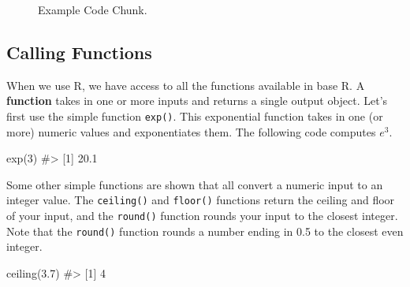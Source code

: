 \documentclass[
  letterpaper,
]{latex/krantz}
\makeatletter
\newenvironment{Shaded}{\begin{snugshade}}{\end{snugshade}}
\newcommand{\CommentTok}[1]{\textcolor[rgb]{0.37,0.37,0.37}{#1}}
\newcommand{\DecValTok}[1]{\textcolor[rgb]{0.68,0.00,0.00}{#1}}
\newcommand{\FloatTok}[1]{\textcolor[rgb]{0.68,0.00,0.00}{#1}}
\newcommand{\FunctionTok}[1]{\textcolor[rgb]{0.28,0.35,0.67}{#1}}
\newcommand{\NormalTok}[1]{\textcolor[rgb]{0.00,0.23,0.31}{#1}}
\newenvironment{kframe}{%
\medskip{}
\setlength{\fboxsep}{.8em}
 \def\at@end@of@kframe{}%
 \ifinner\ifhmode%
  \def\at@end@of@kframe{\end{minipage}}%
  \begin{minipage}{\columnwidth}%
 \fi\fi%
 \def\FrameCommand##1{\hskip\@totalleftmargin \hskip-\fboxsep
 \colorbox{shadecolor}{##1}\hskip-\fboxsep
     \hskip-\linewidth \hskip-\@totalleftmargin \hskip\columnwidth}%
 \MakeFramed {\advance\hsize-\width
   \@totalleftmargin\z@ \linewidth\hsize
   \@setminipage}}%
 {\par\unskip\endMakeFramed%
 \at@end@of@kframe}
\renewenvironment{Shaded}{\begin{kframe}}{\end{kframe}}
\makeatother
\begin{document}
\begin{figure}


\caption{\label{fig-code-chunk}Example Code Chunk.}

\end{figure}%

\subsection{Calling Functions}\label{calling-functions}

When we use R, we have access to all the functions available in base R.
A \textbf{function} takes in one or more inputs and
returns a single output object. Let's first use the simple function
\texttt{exp()}. This exponential
function takes in one (or more) numeric values and exponentiates them.
The following code computes \(e^3\).

\begin{Shaded}
\begin{Highlighting}[]
\FunctionTok{exp}\NormalTok{(}\DecValTok{3}\NormalTok{)}
\CommentTok{\#\textgreater{} [1] 20.1}
\end{Highlighting}
\end{Shaded}

Some other simple functions are shown that all convert a numeric input
to an integer value. The
\texttt{ceiling()} and
\texttt{floor()} functions
return the ceiling and floor of your input, and the
\texttt{round()} function
rounds your input to the closest integer. Note that the \texttt{round()}
function rounds a number ending in 0.5 to the closest even integer.

\begin{Shaded}
\begin{Highlighting}[]
\FunctionTok{ceiling}\NormalTok{(}\FloatTok{3.7}\NormalTok{)}
\CommentTok{\#\textgreater{} [1] 4}
\end{Highlighting}
\end{Shaded}
\end{document}
